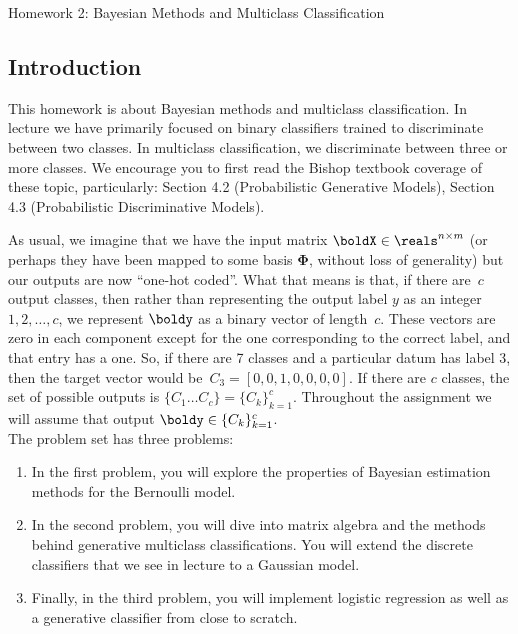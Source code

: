 \documentclass[submit]{harvardml}
\begin{document}
{
  \begin{center}
{\Large Homework 2: Bayesian Methods and Multiclass Classification}\\
\end{center}
}
\subsection*{Introduction}


This homework is about Bayesian methods and multiclass
classification. In lecture we have primarily focused on binary
classifiers trained to discriminate between two classes. In multiclass
classification, we discriminate between three or more classes. We
encourage you to first read the Bishop textbook coverage of these
topic, particularly: Section 4.2 (Probabilistic Generative Models),
Section 4.3 (Probabilistic Discriminative Models).

As usual, we imagine that we have the input matrix $\boldX \in
\reals^{n \times m}$ (or perhaps they have been mapped to some basis
$\bm{\Phi}$, without loss of generality) but our outputs are now
``one-hot coded''.  What that means is that, if there are~$c$ output
classes, then rather than representing the output label $y$ as an
integer~${1,2,\ldots,c}$, we represent $\boldy$ as a binary vector of
length~$c$. These vectors are zero in each component except for the
one corresponding to the correct label, and that entry has a one.  So,
if there are 7 classes and a particular datum has label 3, then the
target vector would be~${C_3 = [0,0,1,0,0,0,0]}$.  If there are $c$
classes, the set of possible outputs is $\{C_1 \ldots C_c \} =
\{C_k\}_{k=1}^c$.  Throughout the assignment we will assume that
output $\boldy \in \{C_k\}_{k=1}^c$.\\

The problem set has three problems:
\begin{enumerate}
\item In the first problem, you will explore the properties of
  Bayesian estimation methods for the Bernoulli model.
%
\item In the second problem, you will dive into matrix algebra and the
  methods behind generative multiclass classifications. You will
  extend the discrete classifiers that we see in lecture to a Gaussian
  model.
%
\item Finally, in the third problem, you will implement logistic
  regression as well as a generative classifier from close to scratch.
%
\end{enumerate}
\end{document}

